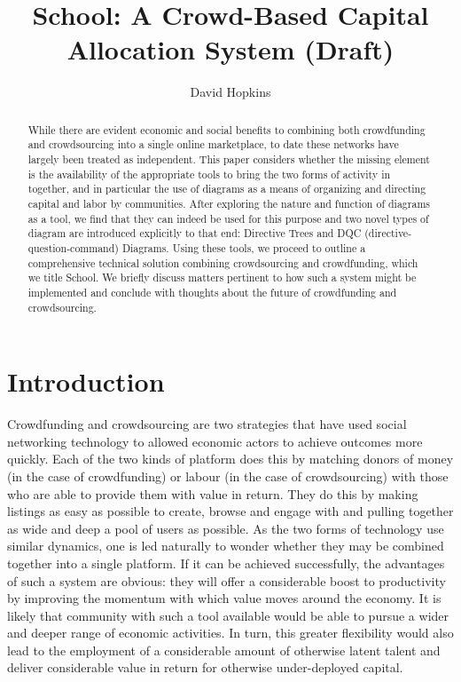 \documentclass{article}
\title{School: A Crowd-Based Capital Allocation System (Draft)}
\author{David Hopkins}
\begin{document}
\maketitle

\begin{abstract}
While there are evident economic and social benefits to combining both crowdfunding and crowdsourcing into a single online marketplace, to date these networks have largely been treated as independent. This paper considers whether the missing element is the availability of the appropriate tools to bring the two forms of activity in together, and in particular the use of diagrams as a means of organizing and directing capital and labor by communities. After exploring the nature and function of diagrams as a tool, we find that they can indeed be used for this purpose and two novel types of diagram are introduced explicitly to that end: Directive Trees and DQC (directive-question-command) Diagrams. Using these tools, we proceed to outline a comprehensive technical solution combining crowdsourcing and crowdfunding, which we title School. We briefly discuss matters pertinent to how such a system might be implemented and conclude with thoughts about the future of crowdfunding and crowdsourcing.

\end{abstract}

\section{Introduction}

Crowdfunding and crowdsourcing are two strategies that have used social networking technology to allowed economic actors to achieve outcomes more quickly. Each of the two kinds of platform does this by matching donors of money (in the case of crowdfunding) or labour (in the case of crowdsourcing) with those who are able to provide them with value in return. They do this by making listings as easy as possible to create, browse and engage with and pulling together as wide and deep a pool of users as possible. As the two forms of technology use similar dynamics, one is led naturally to wonder whether they may be combined together into a single platform. If it can be achieved successfully, the advantages of such a system are obvious: they will offer a considerable boost to productivity by improving the momentum with which value moves around the economy. It is likely that community with such a tool available would be able to pursue a wider and deeper range of economic activities. In turn, this greater flexibility would also lead to the employment of a considerable amount of otherwise latent talent and deliver considerable value in return for otherwise under-deployed capital.
\end{document}

